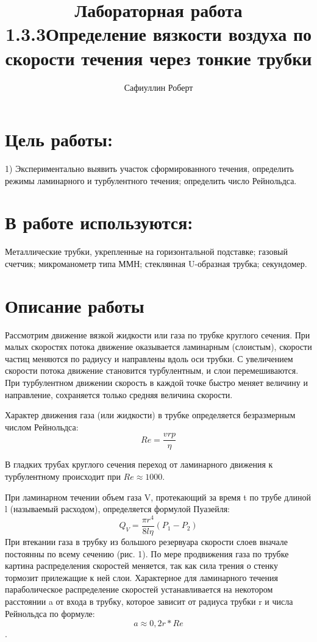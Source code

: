 \documentclass[a4paper,12pt]{article} %
\author{Сафиуллин Роберт	}
\title{Лабораторная работа 1.3.3}
\title{Определение вязкости воздуха по скорости течения через тонкие
трубки}
\begin{document}

\maketitle


\newpage
\section{Цель работы:}
1)  Экспериментально выявить участок сформированного течения, определить режимы ламинарного и турбулентного течения; определить число Рейнольдса.\\
\section{В работе используются:}
Металлические трубки, укрепленные на горизонтальной подставке; газовый счетчик; микроманометр типа ММН; стеклянная U-образная трубка; секундомер.
 \section{Описание работы}
 Рассмотрим движение вязкой жидкости или газа по трубке круглого сечения. При малых скоростях потока движение оказывается ламинарным (слоистым), скорости частиц меняются по радиусу и направлены вдоль оси трубки. С увеличением скорости потока движение
становится турбулентным, и слои перемешиваются. При турбулентном движении скорость в каждой точке быстро меняет величину и направление, сохраняется только средняя величина скорости.

Характер движения газа (или жидкости) в трубке определяется безразмерным числом Рейнольдса: $$Re=\frac{vrp}{\eta}$$

В гладких трубах круглого сечения переход от ламинарного движения к турбулентному происходит при $Re \approx 1000$.

При ламинарном течении объем газа V, протекающий за время t по трубе длиной l (называемый расходом), определяется формулой Пуазейля: $$Q_V=\frac{\pi r^4}{8l\eta}(P_1-P_2)$$
При	втекании	газа	в	
трубку	из большого резервуара скорости слоев вначале постоянны по всему сечению (рис. 1). 
 По мере продвижения  газа по	трубке	
картина распределения скоростей меняется, так как сила трения о стенку тормозит прилежащие к ней слои. Характерное для ламинарного	
течения параболическое распределение скоростей устанавливается на	
некотором расстоянии a от входа в трубку, которое зависит от радиуса трубки r и числа Рейнольдса по формуле: $$a\approx0,2r*Re$$.\\
\end{document}
